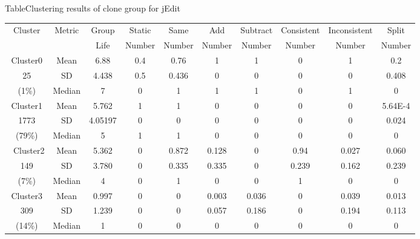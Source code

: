 \begin{table}[htbp]
{Table$\!$}{Clustering results of clone group for jEdit}
\vspace{0.5em}
\centering
\footnotesize
\begin{tabular}{cccccccccc}
\toprule[1.5pt]
\multirow{2}{*}{Cluster}&\multirow{2}{*}{Metric}&Group&Static &Same &Add &Subtract &Consistent &	Inconsistent &Split \\ 
&&Life& Number& Number& Number& Number& Number&	 Number& Number\\ 
\midrule[1pt]
Cluster0&	Mean	&6.88	&0.4	&0.76	&1	&1	&0	&1	&0.2\\
25	&SD&4.438	&0.5	&0.436	&0	&0	&0	&0	&0.408\\ 
(1\%)	&Median	&7	&0	&1	&1	&1	&0	&1	&0\\ 
\hline
Cluster1	&Mean	&5.762	&1	&1	&0	&0	&0	&0	&5.64E-4\\
1773	&SD&4.05197	&0	&0	&0	&0	&0	&0	&0.024\\
(79\%)&	Median&	5	&1&	1&	0&	0&	0&	0&	0\\ 
\hline\
Cluster2	&Mean	&5.362&	0&	0.872&	0.128&	0&	0.94&	0.027&	0.060\\
149&	SD&	3.780&	0&	0.335&	0.335&	0&	0.239 &	0.162 &	0.239 \\ 
(7\%)&	Median&	4&	0&	1&	0&	0&	1&	0&	0\\ 
\hline
Cluster3	&Mean	&0.997&	0&	0	&0.003&0.036	&0	&0.039	&0.013\\ 
309	&SD&1.239&0	&0	&0.057&0.186&0	&0.194&0.113\\ 
(14\%)&	Median&	1&	0&	0&	0&	0&	0&	0&	0\\ 
\bottomrule[1.5pt]
\end{tabular}
\end{table}


